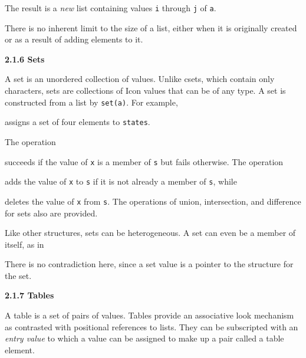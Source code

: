 

The result is a \textit{new} list containing values \texttt{i} through
\texttt{j} of \texttt{a}.

There is no inherent limit to the size of a list, either when it is
originally created or as a result of adding elements to it.

{\sffamily\bfseries
2.1.6 Sets}

A set is an unordered collection of values. Unlike csets, which
contain only characters, sets are collections of Icon values that can
be of any type. A set is constructed from a list by
\texttt{set(a)}. For example,



\noindent
assigns a set of four elements to \texttt{states}.

The operation



\noindent
succeeds if the value of \texttt{x} is a member of \texttt{s} but
fails otherwise. The operation



\noindent
adds the value of \texttt{x} to \texttt{s} if it is not already a
member of \texttt{s}, while



\noindent
deletes the value of \texttt{x} from \texttt{s}. The operations of
union, intersection, and difference for sets also are provided.

Like other structures, sets can be heterogeneous. A set can even be a
member of itself, as in



There is no contradiction here, since a set value is a pointer to the
structure for the set.

{\sffamily\bfseries
2.1.7 Tables}

A table is a set of pairs of values. Tables provide an associative
look mechanism as contrasted with positional references to lists. They
can be subscripted with an \textit{entry value }to which a value can
be assigned to make up a pair called a table element.

